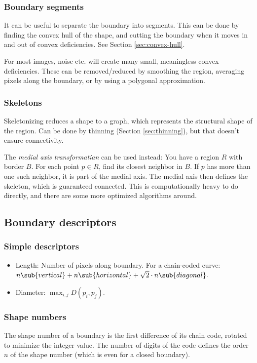 \subsubsection{Boundary segments}
It can be useful to separate the boundary into segments. This can be done by finding the convex hull of the shape, and cutting the boundary when it moves in and out of convex deficiencies. See Section \ref{sec:convex-hull}.

For most images, noise etc. will create many small, meaningless convex deficiencies. These can be removed/reduced by smoothing the region, averaging pixels along the boundary, or by using a polygonal approximation.

\subsubsection{Skeletons}
Skeletonizing reduces a shape to a graph, which represents the structural shape of the region. Can be done by thinning (Section \ref{sec:thinning}), but that doesn't ensure connectivity.

The \emph{medial axis transformatian} can be used instead: You have a region $R$ with border $B$. For each point $p \in R$, find its closest neighbor in $B$. If $p$ has more than one such neighbor, it is part of the medial axis. The medial axis then defines the skeleton, which is guaranteed connected. This is computationally heavy to do directly, and there are some more optimized algorithms around.

\subsection{Boundary descriptors}

\subsubsection{Simple descriptors}
\begin{itemize}
    \item Length: Number of pixels along boundary. For a chain-coded curve: $n\sub{vertical} + n\sub{horizontal} + \sqrt{2} \cdot n\sub{diagonal}$.
    \item Diameter: $\max_{i,j} D(p_i, p_j)$.
\end{itemize}

\subsubsection{Shape numbers}
The shape number of a boundary is the first difference of its chain code, rotated to minimize the integer value. The number of digits of the code defines the order $n$ of the shape number (which is even for a closed boundary).

